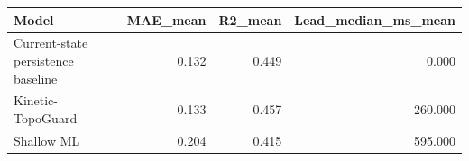 \begin{tabular}{lrrr}
\toprule
Model & MAE\_mean & R2\_mean & Lead\_median\_ms\_mean \\
\midrule
Current-state persistence baseline & 0.132 & 0.449 & 0.000 \\
Kinetic-TopoGuard & 0.133 & 0.457 & 260.000 \\
Shallow ML & 0.204 & 0.415 & 595.000 \\
\bottomrule
\end{tabular}